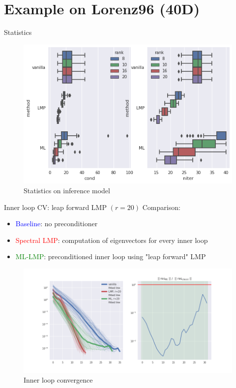 \documentclass[10pt,aspectratio=169]{beamer}
\begin{document}
\section{Example on Lorenz96 (40D)}
\begin{frame}{Statistics}
\begin{figure}
    \centering
    \includegraphics[scale=0.4]{img/boxplot.png}
    \caption{Statistics on inference model}
    \label{fig:stats_inference}
\end{figure}   
\end{frame}
\begin{frame}{Inner loop CV: leap forward LMP $(r=20)$}
Comparison:
\begin{itemize}
    \item \textcolor{blue}{Baseline}: no preconditioner
    \item \textcolor{red}{Spectral LMP}: computation of eigenvectors for every inner loop
    \item \textcolor{green}{ML-LMP}: preconditioned inner loop using "leap forward" LMP
\end{itemize}
\begin{centering}
\begin{figure}
    \centering
    \includegraphics[width=.7\linewidth]{img/40-inv-rank-20-composite-box_rate_cv_inner_loop.png}
    \caption{Inner loop convergence}
    \label{fig:inner_loop_cv}
\end{figure}   
\end{centering}
\end{frame}
\end{document}
